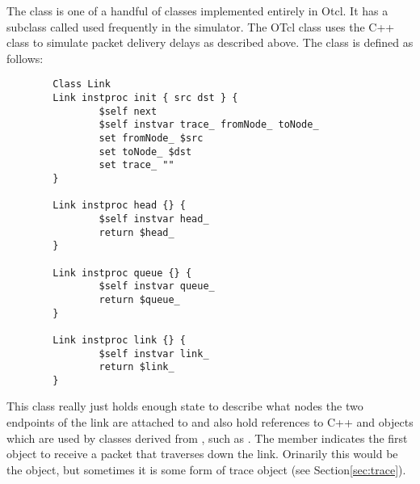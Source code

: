 The  class is one of a handful of classes implemented
entirely in Otcl.  It has a subclass called 
used frequently in the simulator.
The OTcl  class uses the C++  class
to simulate packet delivery delays as described above.
The  class is defined as follows:
\begin{small}
\begin{verbatim}
        Class Link
        Link instproc init { src dst } {
                $self next
                $self instvar trace_ fromNode_ toNode_
                set fromNode_ $src
                set toNode_ $dst
                set trace_ ""
        }

        Link instproc head {} {
                $self instvar head_
                return $head_
        }

        Link instproc queue {} {
                $self instvar queue_
                return $queue_
        }

        Link instproc link {} {
                $self instvar link_
                return $link_
        }
\end{verbatim}
\end{small}
This class really just holds enough state to describe what nodes the two
endpoints of the link are attached to and also hold references to
C++  and  objects which are used by classes
derived from , such as .
The  member indicates the first object to receive
a packet that traverses down the link.
Orinarily this would be the  object, but
sometimes it is some form of trace object (see Section\ref{sec:trace}).


\subsection{}

